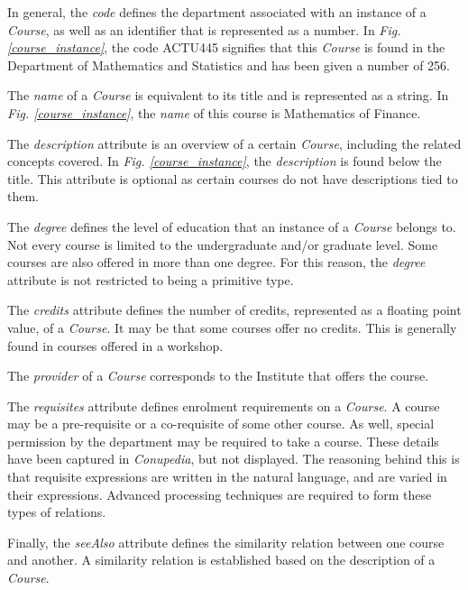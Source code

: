 \documentclass[conference]{IEEEtran}
\begin{document}
        In general, the \textit{code} defines the department associated with an instance of a \textit{Course}, as well as an identifier that is represented as a number. In \textit{Fig. \ref{course_instance}}, the code ACTU445 signifies that this \textit{Course} is found in the Department of Mathematics and Statistics and has been given a number of 256.
        
        The \textit{name} of a \textit{Course} is equivalent to its title and is represented as a string. In \textit{Fig. \ref{course_instance}}, the \textit{name} of this course is Mathematics of Finance.
        
        The \textit{description} attribute is an overview of a certain \textit{Course}, including the related concepts covered. In \textit{Fig. \ref{course_instance}}, the \textit{description} is found below the title. This attribute is optional as certain courses do not have descriptions tied to them.
        
        The \textit{degree} defines the level of education that an instance of a \textit{Course} belongs to. Not every course is limited to the undergraduate and/or graduate level. Some courses are also offered in more than one degree. For this reason, the \textit{degree} attribute is not restricted to being a primitive type.
        
        The \textit{credits} attribute defines the number of credits, represented as a floating point value, of a \textit{Course}. It may be that some courses offer no credits. This is generally found in courses offered in a workshop.
        
        The \textit{provider} of a \textit{Course} corresponds to the Institute that offers the course.
        
        The \textit{requisites} attribute defines enrolment requirements on a \textit{Course}. A course may be a pre-requisite or a co-requisite of some other course. As well, special permission by the department may be required to take a course. These details have been captured in \textit{Conupedia}, but not displayed. The reasoning behind this is that requisite expressions are written in the natural language, and are varied in their expressions. Advanced processing techniques are required to form these types of relations.
        
        Finally, the \textit{seeAlso} attribute defines the similarity relation between one course and another. A similarity relation is established based on the description of a \textit{Course}.
\end{document}
